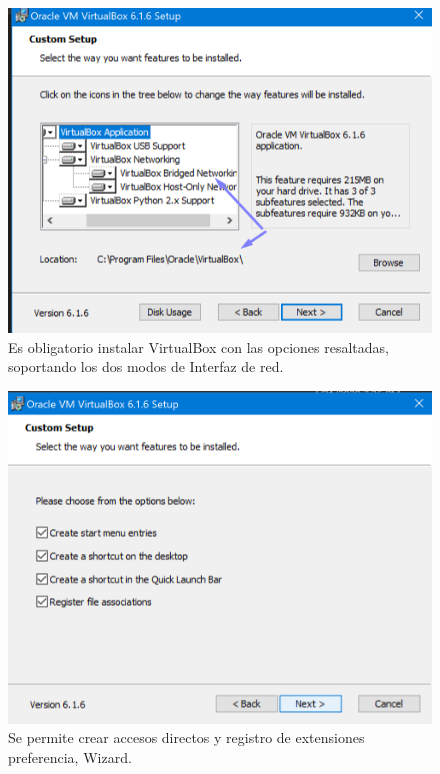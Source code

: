 \documentclass[letterpaper, 12pt, oneside]{article}
\begin{document}
    \begin{center}
    \begin{figure}[H]
        \includegraphics[scale=1]{img/install/virtualbox4.png}
        \caption{Es obligatorio instalar VirtualBox con las opciones resaltadas, soportando los dos modos de Interfaz de red.}
        \label{fig:vbox4}
    \end{figure}  

        \begin{figure}[H]
            \includegraphics[scale=1]{img/install/virtualbox5.png}
            \caption{Se permite crear accesos directos y registro de extensiones preferencia, Wizard.}
            \label{fig:vbox5}
        \end{figure}
        

\end{center}
\end{document}
